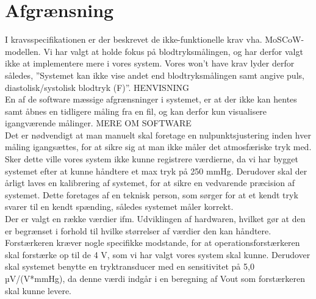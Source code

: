 \section{Afgrænsning}
I kravsspecifikationen er der beskrevet de ikke-funktionelle krav vha. MoSCoW- modellen. Vi har valgt at holde fokus på blodtryksmålingen, og har derfor valgt ikke at implementere mere i vores system. Vores won’t have krav lyder derfor således,
”Systemet kan ikke vise andet end blodtryksmålingen samt angive puls, diastolisk/systolisk blodtryk (F)”. HENVISNING\\

En af de software mæssige afgrænsninger i systemet, er at der ikke kan hentes samt åbnes en tidligere måling fra en fil, og kan derfor kun visualisere igangværende målinger. MERE OM SOFTWARE\\

Det er nødvendigt at man manuelt skal foretage en nulpunktsjustering inden hver måling igangsættes, for at sikre sig at man ikke måler det atmosfæriske tryk med. Sker dette ville vores system ikke kunne registrere værdierne, da vi har bygget systemet efter at kunne håndtere et max tryk på 250 mmHg. Derudover skal der årligt laves en kalibrering af systemet, for at sikre en vedvarende præcision af systemet. Dette foretages af en teknisk person, som sørger for at et kendt tryk svarer til en kendt spænding, således systemet måler korrekt.\\

Der er valgt en række værdier ifm. Udviklingen af hardwaren, hvilket gør at den er begrænset i forhold til hvilke størrelser af værdier den kan håndtere. Forstærkeren kræver nogle specifikke modstande, for at operationsforstærkeren skal forstærke op til de 4 V, som vi har valgt vores system skal kunne. Derudover skal systemet benytte en tryktransducer med en sensitivitet på 5,0 µV/(V*mmHg), da denne værdi indgår i en beregning af Vout som forstærkeren skal kunne levere.\clearpage